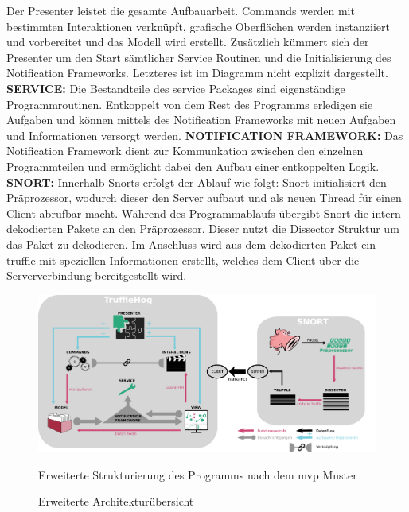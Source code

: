 Der Presenter leistet die gesamte Aufbauarbeit. Commands werden mit bestimmten Interaktionen verknüpft, grafische Oberflächen werden instanziiert und vorbereitet und das Modell wird erstellt. 
Zusätzlich kümmert sich der Presenter um den Start sämtlicher Service Routinen und die Initialisierung des Notification Frameworks. Letzteres ist im Diagramm nicht explizit dargestellt.\newline
 \newline
\textbf{SERVICE:}\newline
Die Bestandteile des service Packages sind eigenständige Programmroutinen. Entkoppelt von dem Rest des Programms erledigen sie Aufgaben und können mittels des Notification Frameworks mit neuen Aufgaben und Informationen versorgt werden.\newline
 \newline
\textbf{NOTIFICATION FRAMEWORK:}\newline
Das Notification Framework dient zur Kommunkation zwischen den einzelnen Programmteilen und ermöglicht dabei den Aufbau einer entkoppelten Logik.\newline
 \newline
\textbf{SNORT:}\newline
Innerhalb Snorts erfolgt der Ablauf wie folgt: Snort initialisiert den Präprozessor, wodurch dieser den Server aufbaut und als neuen Thread für einen Client abrufbar macht. Während des Programmablaufs übergibt Snort die intern dekodierten Pakete an den Präprozessor. Dieser nutzt die Dissector Struktur um das Paket zu dekodieren. Im Anschluss wird aus dem dekodierten Paket ein \gls{truffle} mit speziellen Informationen erstellt, welches dem Client über die Serververbindung bereitgestellt wird.\newline

\begin{figure}
  \centering
  \includegraphics[width=\textwidth]{../diagramimages/arch_diagram_mvp.png}
  \caption[Erweiterte Architekturübersicht]{Erweiterte Architekturübersicht}
  \medskip
  Erweiterte Strukturierung des Programms nach dem \gls{mvp} Muster
  \label{fig:arch_diagram}
\end{figure}
\FloatBarrier
